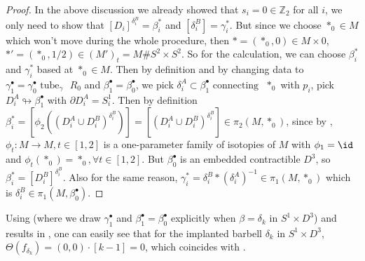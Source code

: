 \begin{proof}
    In the above discussion we already showed that $s_i=0\in \mathbb{Z}_2$ for all $i$, we only need to show that $[D_i]^{\delta_i^B}=\beta_i^*$ and $[\delta_i^B]=\gamma_i^*$. But since we choose $*_0\in M$ which won't move during the whole procedure, then $*=(*_0,0)\in M\times 0$, $*'=(*_0,1/2)\in (M')_t=M\# S^2\times S^2$. So for the calculation, we can choose $\beta_i^*$ and $\gamma_i^*$ based at $*_0\in M$. Then by definition and by changing data to $\gamma_1^\bullet=\gamma_0^\bullet \text{ tube}_\gamma \text{ }R_0$ and $\beta_1^\bullet=\beta_0^\bullet$, we pick $\delta_i^A\subset \beta_1^\bullet \text{ connecting }$ $*_0$ with $p_i$, pick $D_i^A\looparrowright \beta_1^\bullet$ with $\partial D_i^A=S_i^1$. Then by definition $\beta_i^*=[\phi_2((D_i^A\cup D_i^B)^{\delta_i^B})]=[(D_i^A\cup D_i^B)^{\delta_i^B}]\in \pi_2(M, *_0)$, since by , $ \phi_t: M\to M,t\in[1,2]$ is a one-parameter family of isotopies of $M$ with $\phi_1=\id$ and $\phi_t(*_0)=*_0,\forall t\in [1,2]$. But $\beta_0^\bullet$ is an embedded contractible $D^3$, so $\beta_i^*=[D_i^B]^{\delta_i^B}$. Also for the same reason, $\gamma_i^*=\delta_i^B*(\delta_i^A)^{-1}\in \pi_1(M, *_0)$ which is $\delta_i^B\in \pi_1(M, \beta_0^\bullet)$. 
\end{proof}

\begin{example}
    Using  (where we draw $\gamma_1^\bullet$ and $\beta_1^\bullet=\beta_0^\bullet$ explicitly when $\beta=\delta_k$ in $S^1\times D^3$) and results in , one can easily see that for the implanted barbell $\delta_k$ in $S^1\times D^3$, $\Theta(f_{\delta_k})=(0,0)\cdot [k-1]=0$, which coincides with .
\end{example}
